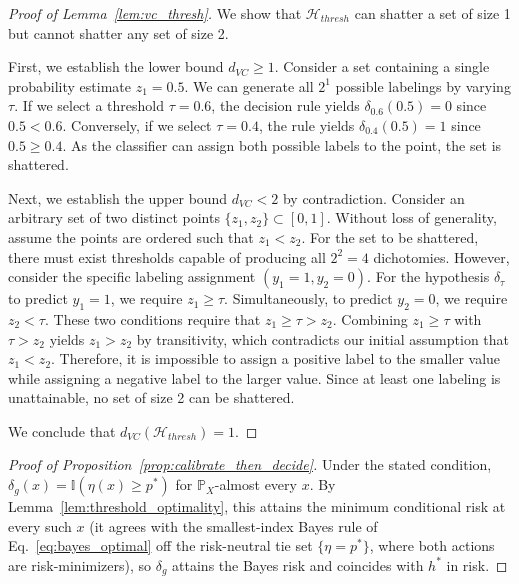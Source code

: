 \begin{proof}[Proof of Lemma~\ref{lem:vc_thresh}]
We show that $\mathcal{H}_{thresh}$ can shatter a set of size 1 but cannot shatter any set of size 2.

First, we establish the lower bound $d_{VC} \geq 1$. Consider a set containing a single probability estimate $z_1 = 0.5$. We can generate all $2^1$ possible labelings by varying $\tau$. If we select a threshold $\tau = 0.6$, the decision rule yields $\delta_{0.6}(0.5) = 0$ since $0.5 < 0.6$. Conversely, if we select $\tau = 0.4$, the rule yields $\delta_{0.4}(0.5) = 1$ since $0.5 \geq 0.4$. As the classifier can assign both possible labels to the point, the set is shattered.

Next, we establish the upper bound $d_{VC} < 2$ by contradiction. Consider an arbitrary set of two distinct points $\{z_1, z_2\} \subset [0, 1]$. Without loss of generality, assume the points are ordered such that $z_1 < z_2$. For the set to be shattered, there must exist thresholds capable of producing all $2^2 = 4$ dichotomies. However, consider the specific labeling assignment $(y_1=1, y_2=0)$. For the hypothesis $\delta_\tau$ to predict $y_1=1$, we require $z_1 \geq \tau$. Simultaneously, to predict $y_2=0$, we require $z_2 < \tau$. These two conditions require that $z_1 \geq \tau > z_2$. Combining $z_1 \geq \tau$ with $\tau > z_2$ yields $z_1 > z_2$ by transitivity, which contradicts our initial assumption that $z_1 < z_2$. Therefore, it is impossible to assign a positive label to the smaller value while assigning a negative label to the larger value. Since at least one labeling is unattainable, no set of size 2 can be shattered.

We conclude that $d_{VC}(\mathcal{H}_{thresh}) = 1$.
\end{proof}

\begin{proof}[Proof of Proposition~\ref{prop:calibrate_then_decide}]
Under the stated condition, $\delta_g(x) = \mathbb{I}(\eta(x) \geq p^*)$ for $\mathbb{P}_X$-almost every $x$. By Lemma~\ref{lem:threshold_optimality}, this attains the minimum conditional risk at every such $x$ (it agrees with the smallest-index Bayes rule of Eq.~\eqref{eq:bayes_optimal} off the risk-neutral tie set $\{\eta = p^*\}$, where both actions are risk-minimizers), so $\delta_g$ attains the Bayes risk and coincides with $h^*$ in risk.
\end{proof}

